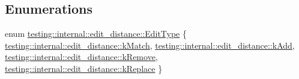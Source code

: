 \subsection*{Enumerations}
\begin{DoxyCompactItemize}
\item 
enum \mbox{\hyperlink{namespacetesting_1_1internal_1_1edit__distance_ad46aa6da12aec1a3f166310478b53a08}{testing\+::internal\+::edit\+\_\+distance\+::\+Edit\+Type}} \{ \mbox{\hyperlink{namespacetesting_1_1internal_1_1edit__distance_ad46aa6da12aec1a3f166310478b53a08a7bdb9c74613a94f21b7489e0b5640a63}{testing\+::internal\+::edit\+\_\+distance\+::k\+Match}}, 
\mbox{\hyperlink{namespacetesting_1_1internal_1_1edit__distance_ad46aa6da12aec1a3f166310478b53a08a63400b073f5b311a87d568b5ae27ffe8}{testing\+::internal\+::edit\+\_\+distance\+::k\+Add}}, 
\mbox{\hyperlink{namespacetesting_1_1internal_1_1edit__distance_ad46aa6da12aec1a3f166310478b53a08a814768ef6cd0264a0a10b1e701a63e78}{testing\+::internal\+::edit\+\_\+distance\+::k\+Remove}}, 
\mbox{\hyperlink{namespacetesting_1_1internal_1_1edit__distance_ad46aa6da12aec1a3f166310478b53a08afdbf30ecf9f32f60c646a34a358615f2}{testing\+::internal\+::edit\+\_\+distance\+::k\+Replace}}
 \}
\end{DoxyCompactItemize}
